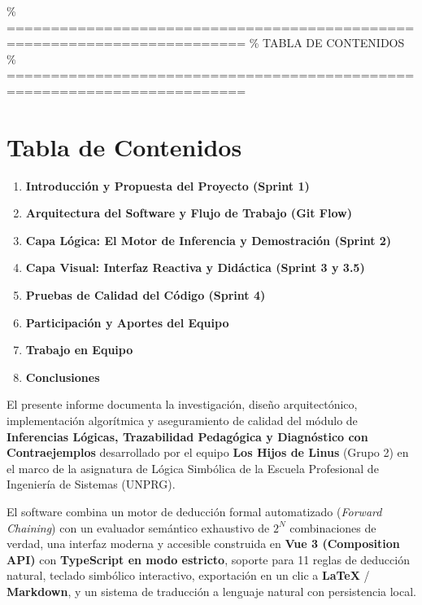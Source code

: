 \documentclass[11pt,a4paper]{article}
\begin{document}
\% =========================================================================
\% TABLA DE CONTENIDOS
\% =========================================================================
\newpage
\section*{Tabla de Contenidos}
\vspace{0.5cm}
\begin{enumerate}[label=\textbf{\arabic*.}]
    \setlength{\itemsep}{0.35cm}
    \item \textbf{Introducción y Propuesta del Proyecto (Sprint 1)}
    \item \textbf{Arquitectura del Software y Flujo de Trabajo (Git Flow)}
    \item \textbf{Capa Lógica: El Motor de Inferencia y Demostración (Sprint 2)}
    \item \textbf{Capa Visual: Interfaz Reactiva y Didáctica (Sprint 3 y 3.5)}
    \item \textbf{Pruebas de Calidad del Código (Sprint 4)}
    \item \textbf{Participación y Aportes del Equipo}
    \item \textbf{Trabajo en Equipo}
    \item \textbf{Conclusiones}
\end{enumerate}

\vspace{1.5cm}
\begin{tcolorbox}[colback=lightbg,colframe=bordergray,arc=2mm,title=\textbf{Resumen Ejecutivo}]
El presente informe documenta la investigación, diseño arquitectónico, implementación algorítmica y aseguramiento de calidad del módulo de \textbf{Inferencias Lógicas, Trazabilidad Pedagógica y Diagnóstico con Contraejemplos} desarrollado por el equipo \textbf{Los Hijos de Linus} (Grupo 2) en el marco de la asignatura de Lógica Simbólica de la Escuela Profesional de Ingeniería de Sistemas (UNPRG).

El software combina un motor de deducción formal automatizado (\textit{Forward Chaining}) con un evaluador semántico exhaustivo de $2^N$ combinaciones de verdad, una interfaz moderna y accesible construida en \textbf{Vue 3 (Composition API)} con \textbf{TypeScript en modo estricto}, soporte para 11 reglas de deducción natural, teclado simbólico interactivo, exportación en un clic a \textbf{\LaTeX} / \textbf{Markdown}, y un sistema de traducción a lenguaje natural con persistencia local.
\end{tcolorbox}
\end{document}
